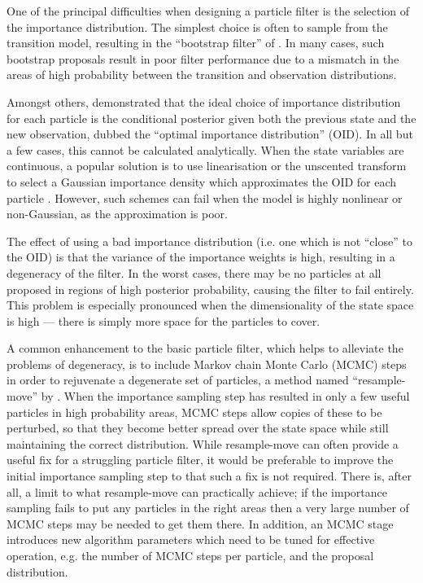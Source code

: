 \documentclass{article}
\begin{document}
One of the principal difficulties when designing a particle filter is the selection of the importance distribution. The simplest choice is often to sample from the transition model, resulting in the ``bootstrap filter'' of \citep{Gordon1993}. In many cases, such bootstrap proposals result in poor filter performance due to a mismatch in the areas of high probability between the transition and observation distributions.

Amongst others, \citet{Doucet2000a} demonstrated that the ideal choice of importance distribution for each particle is the conditional posterior given both the previous state and the new observation, dubbed the ``optimal importance distribution'' (OID). In all but a few cases, this cannot be calculated analytically. When the state variables are continuous, a popular solution is to use linearisation or the unscented transform to select a Gaussian importance density which approximates the OID for each particle \cite{Doucet2000a,Merwe2000}. However, such schemes can fail when the model is highly nonlinear or non-Gaussian, as the approximation is poor.

The effect of using a bad importance distribution (i.e. one which is not ``close'' to the OID) is that the variance of the importance weights is high, resulting in a degeneracy of the filter. In the worst cases, there may be no particles at all proposed in regions of high posterior probability, causing the filter to fail entirely. This problem is especially pronounced when the dimensionality of the state space is high --- there is simply more space for the particles to cover.
%

A common enhancement to the basic particle filter, which helps to alleviate the problems of degeneracy, is to include Markov chain Monte Carlo (MCMC) steps in order to rejuvenate a degenerate set of particles, a method named ``resample-move'' by \citet{Gilks2001}. When the importance sampling step has resulted in only a few useful particles in high probability areas, MCMC steps allow copies of these to be perturbed, so that they become better spread over the state space while still maintaining the correct distribution. While resample-move can often provide a useful fix for a struggling particle filter, it would be preferable to improve the initial importance sampling step to that such a fix is not required. There is, after all, a limit to what resample-move can practically achieve; if the importance sampling fails to put any particles in the right areas then a very large number of MCMC steps may be needed to get them there. In addition, an MCMC stage introduces new algorithm parameters which need to be tuned for effective operation, e.g. the number of MCMC steps per particle, and the proposal distribution.
\end{document}
